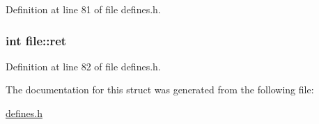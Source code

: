 Definition at line 81 of file defines.\-h.

\hypertarget{structfile_a6d285b7a32eb853a1dcb00014942d8ae}{
\subsubsection[{ret}]{\setlength{\rightskip}{0pt plus 5cm}int file\-::ret}}\label{structfile_a6d285b7a32eb853a1dcb00014942d8ae}


Definition at line 82 of file defines.\-h.



The documentation for this struct was generated from the following file\-:\begin{DoxyCompactItemize}
\item 
\hyperlink{defines_8h}{defines.\-h}\end{DoxyCompactItemize}
